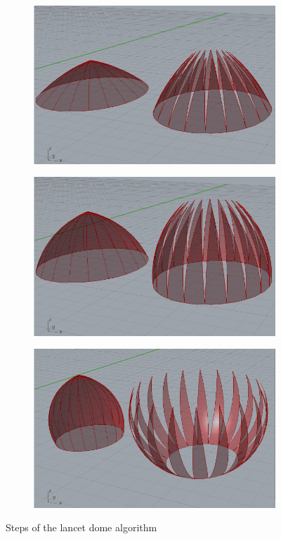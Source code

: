 \documentclass[preprint,12pt,3p]{elsarticle}
\begin{document}
\begin{figure}[h]
\begin{subfigure}{0.3\textwidth}
  \centering
  \includegraphics[width=.9\linewidth]{lancetDome01.png}
  \caption{}
  \label{fig:lancetDome01}
\end{subfigure}%
\begin{subfigure}{0.3\textwidth}
  \centering
  \includegraphics[width=.9\linewidth]{lancetDome02.png}
  \caption{}
  \label{fig:lancetDome02}
\end{subfigure}
\begin{subfigure}{0.3\textwidth}
  \centering
  \includegraphics[width=.9\linewidth]{lancetDome03.png}
  \caption{}
  \label{fig:lancetDome03}
\end{subfigure}

\caption{Steps of the lancet dome algorithm}
\label{fig:lancetdomeexamples}
\end{figure}
\end{document}
